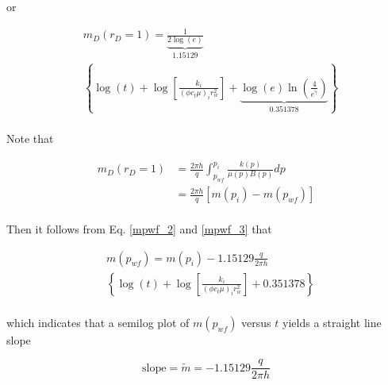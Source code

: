 \documentclass{llncs}
\numberwithin{equation}{section}
\numberwithin{figure}{section}
\numberwithin{table}{section}
\begin{document}
    or

    \begin{equation}
       \begin{split}
        & {{m}_{D}}\left( {{r}_{D}}=1 \right)=\underbrace{\frac{1}{2\log \left( e \right)}}_{\text{1}\text{.15129}} \\
    & \left\{ \log \left( t \right)+\log \left[ \frac{{{k}_{i}}}{{{\left( \phi {{c}_{t}}\mu  \right)}_{i}}r_{w}^{2}} \right]+\underbrace{\log \left( e \right)\ln \left( \frac{4}{{{e}^{\widetilde{\gamma }}}} \right)}_{\text{0}\text{.351378}} \right\} \\
    \end{split}
        \label{mpwf_2}
    \end{equation}

    Note that

    \begin{equation}
     \begin{split}
     {{m}_{D}}\left( {{r}_{D}}=1 \right)&=\frac{2\pi h}{q}\int_{{{p}_{wf}}}^{{{p}_{i}}}{\frac{k\left( p \right)}{\mu \left( p \right)B\left( p \right)}}dp \\
     & =\frac{2\pi h}{q}\left[ m\left( {{p}_{i}} \right)-m\left( {{p}_{wf}} \right) \right] \\
    \end{split}
        \label{mpwf_3}
    \end{equation}

    Then it follows from Eq. \ref{mpwf_2} and \ref{mpwf_3} that

    \begin{equation}
    \begin{split}
    & m\left( {{p}_{wf}} \right)=m\left( {{p}_{i}} \right)-\text{1}\text{.15129}\frac{q}{2\pi h} \\
    & \left\{ \log \left( t \right)+\log \left[ \frac{{{k}_{i}}}{{{\left( \phi {{c}_{t}}\mu  \right)}_{i}}r_{w}^{2}} \right]+\text{0}\text{.351378} \right\} \\
    \end{split}
        \label{mpwf_4}
    \end{equation}

    which indicates that a semilog plot of $m(p_{wf})$ versus $t$  yields a straight line  slope

    \begin{equation}
        \text{slope}=\widetilde{m}=-\text{1}\text{.15129}\frac{q}{2\pi h}
        \label{semilog_slope}
    \end{equation}
\end{document}
